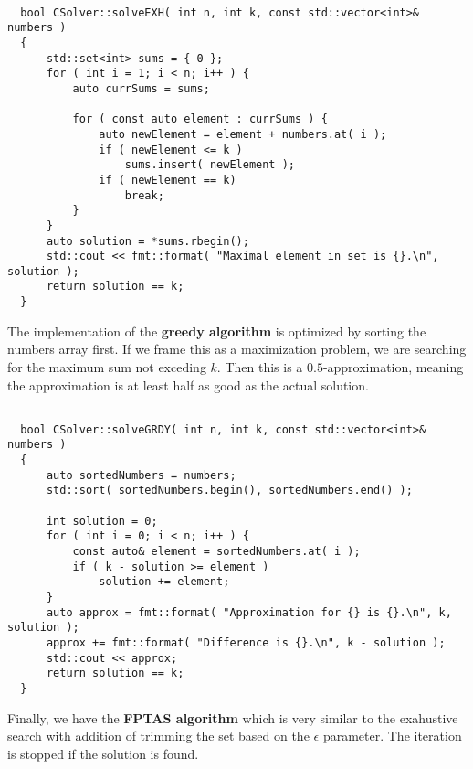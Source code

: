 \documentclass[11pt]{article}
\begin{document}
\begin{verbatim}

  bool CSolver::solveEXH( int n, int k, const std::vector<int>& numbers )
  {
      std::set<int> sums = { 0 };
      for ( int i = 1; i < n; i++ ) {
          auto currSums = sums;
  
          for ( const auto element : currSums ) {
              auto newElement = element + numbers.at( i );
              if ( newElement <= k )
                  sums.insert( newElement );
              if ( newElement == k)
                  break;
          }
      }
      auto solution = *sums.rbegin();
      std::cout << fmt::format( "Maximal element in set is {}.\n", solution );
      return solution == k;
  } 
\end{verbatim}

\pagebreak
The implementation of the \textbf{greedy algorithm} is optimized by sorting the numbers array first. If we frame this as a maximization problem, we are searching for the maximum sum not exceding $k$. Then this is a $0.5$-approximation, meaning the approximation is at least half as good as the actual solution.

\begin{verbatim}

  bool CSolver::solveGRDY( int n, int k, const std::vector<int>& numbers )
  {
      auto sortedNumbers = numbers;
      std::sort( sortedNumbers.begin(), sortedNumbers.end() );
  
      int solution = 0;
      for ( int i = 0; i < n; i++ ) {
          const auto& element = sortedNumbers.at( i );
          if ( k - solution >= element )
              solution += element;
      }
      auto approx = fmt::format( "Approximation for {} is {}.\n", k, solution );
      approx += fmt::format( "Difference is {}.\n", k - solution );
      std::cout << approx;
      return solution == k;
  }  
\end{verbatim}

Finally, we have the \textbf{FPTAS algorithm} which is very similar to the exahustive search with addition of trimming the set based on the $\epsilon$ parameter. The iteration is stopped if the solution is found.
\end{document}
